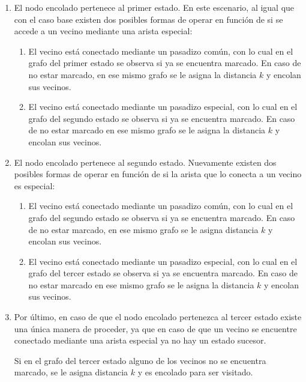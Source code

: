 	\begin{enumerate}
		\item{
			El nodo encolado pertenece al primer estado. En este escenario, al
			igual que con el caso base existen dos posibles formas de operar en
			función de si se accede a un vecino mediante una arista especial:

			\begin{enumerate}
				\item{
					El vecino está conectado mediante un pasadizo común, con lo
					cual en el grafo del primer estado se observa si ya se
					encuentra marcado. En caso de no estar marcado, en ese
					mismo grafo se le asigna la distancia $k$ y encolan sus
					vecinos.
				}
				\item{
					El vecino está conectado mediante un pasadizo especial, con
					lo cual en el grafo del segundo estado se observa si ya se
					encuentra marcado. En caso de no estar marcado en ese mismo
					grafo se le asigna la distancia $k$ y encolan sus vecinos.
				}
			\end{enumerate}
		}
		\item{
			El nodo encolado pertenece al segundo estado. Nuevamente existen dos
			posibles formas de operar en función de si la arista que lo conecta
			a un vecino es especial:

			\begin{enumerate}
				\item{
					El vecino está conectado mediante un pasadizo común, con lo
					cual en el grafo del segundo estado se observa si ya se
					encuentra marcado. En caso de no estar marcado, en ese mismo
					grafo se le asigna distancia $k$ y encolan sus vecinos.
				}
				\item{
					El vecino está conectado mediante un pasadizo especial, con
					lo cual en el grafo del tercer estado se observa si ya se
					encuentra marcado. En caso de no estar marcado en ese mismo
					grafo se le asigna la distancia $k$ y encolan sus vecinos.
				}
			\end{enumerate}
		}
		\item{
			Por último, en caso de que el nodo encolado pertenezca al tercer
			estado existe una única manera de proceder, ya que en caso de que un
			vecino se encuentre conectado mediante una arista especial ya no hay
			un estado sucesor.

			Si en el grafo del tercer estado alguno de los vecinos no se
			encuentra marcado, se le asigna distancia $k$ y es encolado para ser
			visitado.
		}
	\end{enumerate}

